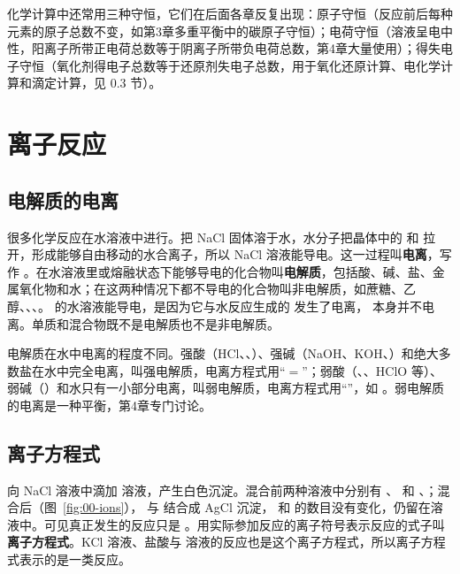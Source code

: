 \documentclass[UTF8,a4paper,zihao=5,oneside,openany,fontset=none]{ctexbook}
\begin{document}
化学计算中还常用三种守恒，它们在后面各章反复出现：原子守恒（反应前后每种元素的原子总数不变，如第3章多重平衡中的碳原子守恒）；电荷守恒（溶液呈电中性，阳离子所带正电荷总数等于阴离子所带负电荷总数，第4章大量使用）；得失电子守恒（氧化剂得电子总数等于还原剂失电子总数，用于氧化还原计算、电化学计算和滴定计算，见 0.3 节）。

\section{离子反应}

\subsection{电解质的电离}
很多化学反应在水溶液中进行。把 NaCl 固体溶于水，水分子把晶体中的  和  拉开，形成能够自由移动的水合离子，所以 NaCl 溶液能导电。这一过程叫\textbf{电离}，写作 。在水溶液里或熔融状态下能够导电的化合物叫\textbf{电解质}，包括酸、碱、盐、金属氧化物和水；在这两种情况下都不导电的化合物叫非电解质，如蔗糖、乙醇、、、。 的水溶液能导电，是因为它与水反应生成的  发生了电离， 本身并不电离。单质和混合物既不是电解质也不是非电解质。

电解质在水中电离的程度不同。强酸（HCl、、）、强碱（NaOH、KOH、）和绝大多数盐在水中完全电离，叫强电解质，电离方程式用“$=$”；弱酸（、、HClO 等）、弱碱（）和水只有一小部分电离，叫弱电解质，电离方程式用“\ce{<=>}”，如 。弱电解质的电离是一种平衡，第4章专门讨论。

\subsection{离子方程式}
向 NaCl 溶液中滴加  溶液，产生白色沉淀。混合前两种溶液中分别有 、 和 、；混合后（图~\ref{fig:00-ions}）， 与  结合成 AgCl 沉淀， 和  的数目没有变化，仍留在溶液中。可见真正发生的反应只是 。用实际参加反应的离子符号表示反应的式子叫\textbf{离子方程式}。KCl 溶液、盐酸与  溶液的反应也是这个离子方程式，所以离子方程式表示的是一类反应。
\end{document}

